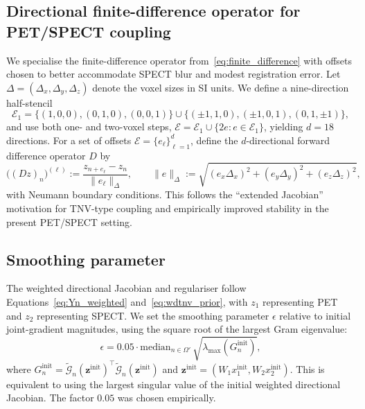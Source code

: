 \subsection{Directional finite-difference operator for PET/SPECT coupling}
\label{subsec:90y_directional_stencil}

We specialise the finite-difference operator from~\eqref{eq:finite_difference} with offsets chosen to better accommodate SPECT blur and modest registration error. Let $\Delta=(\Delta_x,\Delta_y,\Delta_z)$ denote the voxel sizes in SI units. We define a nine-direction half-stencil
\begin{equation}
\mathcal{E}_1
=
\{(1,0,0),(0,1,0),(0,0,1)\}
\cup
\{(\pm1,1,0),(\pm1,0,1),(0,1,\pm1)\},
\end{equation}
and use both one- and two-voxel steps, $\mathcal{E}=\mathcal{E}_1\cup\{2e:e\in\mathcal{E}_1\}$, yielding $d=18$ directions. For a set of offsets $\mathcal{E}=\{e_\ell\}_{\ell=1}^{d}$, define the $d$-directional forward difference operator $D$ by
\begin{equation}
\big((D z)_n\big)^{(\ell)} :=
\frac{z_{n+e_\ell}-z_n}{\|e_\ell\|_\Delta},
\qquad
\|e\|_\Delta := \sqrt{(e_x\Delta_x)^2+(e_y\Delta_y)^2+(e_z\Delta_z)^2},
\label{eq:90y_directional_D}
\end{equation}
with Neumann boundary conditions. This follows the ``extended Jacobian'' motivation for TNV-type coupling \cite{holtTotalNuclearVariation2014} and empirically improved stability in the present PET/SPECT setting.

\subsection{Smoothing parameter}
\label{subsec:90y_wdtnv_def}

The weighted directional Jacobian and regulariser follow Equations~\eqref{eq:Yn_weighted} and~\eqref{eq:wdtnv_prior}, with $z_1$ representing PET and $z_2$ representing SPECT. We set the smoothing parameter $\epsilon$ relative to initial joint-gradient magnitudes, using the square root of the largest Gram eigenvalue:
\begin{equation}
\epsilon
=
0.05\cdot \mathrm{median}_{n\in\Omega'}\,\sqrt{\lambda_{\max}(G_n^{\mathrm{init}})},
\label{eq:90y_epsilon_def}
\end{equation}
where $G_n^{\mathrm{init}}=\tilde{\mathcal{G}}_n(\bm{z}^{\mathrm{init}})^\top\tilde{\mathcal{G}}_n(\bm{z}^{\mathrm{init}})$ and $\bm{z}^{\mathrm{init}}=(W_1 x_1^{\mathrm{init}},W_2 x_2^{\mathrm{init}})$. This is equivalent to using the largest singular value of the initial weighted directional Jacobian. The factor $0.05$ was chosen empirically.

